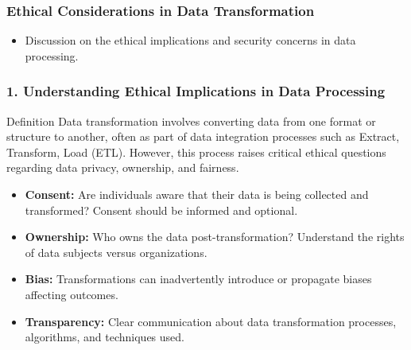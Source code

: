 \documentclass[aspectratio=169]{beamer}
\begin{document}
\begin{frame}[fragile]
    \frametitle{Ethical Considerations in Data Transformation}
    \begin{itemize}
        \item Discussion on the ethical implications and security concerns in data processing.
    \end{itemize}
\end{frame}

\begin{frame}[fragile]
    \frametitle{1. Understanding Ethical Implications in Data Processing}
    \begin{block}{Definition} 
        Data transformation involves converting data from one format or structure to another, often as part of data integration processes such as Extract, Transform, Load (ETL). However, this process raises critical ethical questions regarding data privacy, ownership, and fairness.
    \end{block}

    \begin{itemize}
        \item \textbf{Consent:} Are individuals aware that their data is being collected and transformed? Consent should be informed and optional.
        \item \textbf{Ownership:} Who owns the data post-transformation? Understand the rights of data subjects versus organizations.
        \item \textbf{Bias:} Transformations can inadvertently introduce or propagate biases affecting outcomes.
        \item \textbf{Transparency:} Clear communication about data transformation processes, algorithms, and techniques used.
    \end{itemize}
\end{frame}
\end{document}
